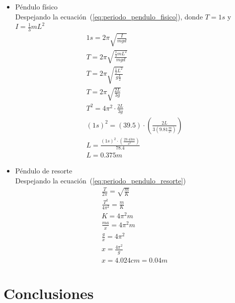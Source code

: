 \documentclass[twocolumn, 12pt]{article}
\begin{document}
\begin{itemize}[label=$\triangleright$]
    \item Péndulo físico \\ Despejando la
          ecuación~(\ref{eq:periodo_pendulo_fisico}), donde $T = 1s$
          y $I = \frac{1}{3} m L^{2}$
          \begin{equation*}
              \begin{gathered}
                  1s = 2 \pi \sqrt{\frac{I}{m g d}} \\
                  T = 2 \pi \sqrt{\frac{\frac{1}{3} m L^{2}}{m g d}} \\
                  T = 2 \pi \sqrt{\frac{\frac{1}{3} L^{2}}{g \frac{L}{2}}} \\
                  T = 2 \pi \sqrt{\frac{2L}{3g}} \\
                  T^{2} = 4\pi^{2} \cdot \frac{2L}{3g} \\
                  {(1s)}^{2} = (39.5) \cdot (\frac{2L}{3 (9.81 \frac{m}{s^{2}})})\\
                  L = \frac{{(1s)}^{2} \cdot (\frac{29.43m}{s^{2}})}{78.4}\\
                  L = 0.375m
              \end{gathered}
          \end{equation*}
    \item Péndulo de resorte \\ Despejando la
          ecuación~(\ref{eq:periodo_pendulo_resorte})
          \begin{equation*}
              \begin{gathered}
                  \frac{T}{2\pi} = \sqrt{\frac{m}{K}} \\
                  \frac{T^2}{4 \pi^2} = \frac{m}{K} \\
                  K = 4 \pi^2 m \\
                  \frac{m a}{x} = 4 \pi^2 m \\
                  \frac{g}{x} = 4 \pi^2 \\
                  x = \frac{4\pi^2}{g}\\
                  x = 4.024 cm = 0.04 m
              \end{gathered}
          \end{equation*}
\end{itemize}

\section{Conclusiones}
\end{document}
